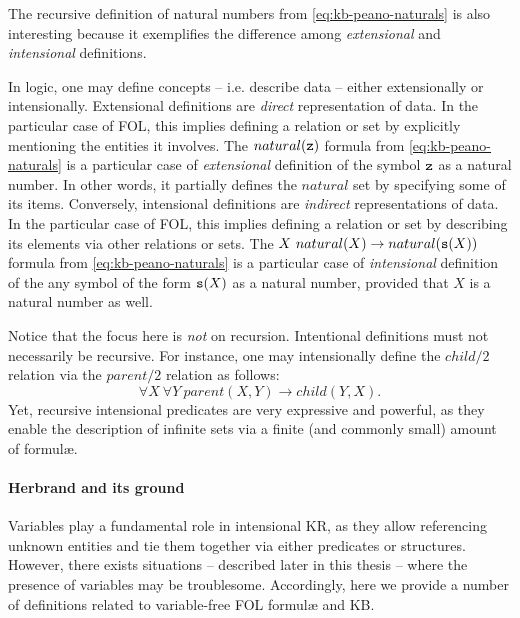 \documentclass[12pt,a4paper,openright,twoside]{book}
\begin{document}
The recursive definition of natural numbers from \cref{eq:kb-peano-naturals} is also interesting because it exemplifies the difference among \emph{extensional} and \emph{intensional} definitions.

In logic, one may define concepts -- i.e. describe data -- either extensionally or intensionally.
%
Extensional definitions are \emph{direct} representation of data.
%
In the particular case of FOL, this implies defining a relation or set by explicitly mentioning the entities it involves.
%
The $natural(\mathtt{z})$ formula from \cref{eq:kb-peano-naturals} is a particular case of \emph{extensional} definition of the symbol $\mathtt{z}$ as a natural number.
%
In other words, it partially defines the $natural$ set by specifying some of its items.
%
Conversely, intensional definitions are \emph{indirect} representations of data.
%
In the particular case of FOL, this implies defining a relation or set by describing its elements via other relations or sets.
%
The $X\ natural(X) \rightarrow natural(\functor{s}(X))$ formula from \cref{eq:kb-peano-naturals} is a particular case of \emph{intensional} definition of the any symbol of the form $\mathtt{s}(X)$ as a natural number, provided that $X$ is a natural number as well.

Notice that the focus here is \emph{not} on recursion.
%
Intentional definitions must not necessarily be recursive.
%
For instance, one may intensionally define the $child/2$ relation via the $parent/2$ relation as follows:
%
\begin{equation*}
    \forall X ~ \forall Y\ parent(X, Y) \rightarrow child(Y, X).
\end{equation*}
%
Yet, recursive intensional predicates are very expressive and powerful, as they enable the description of infinite sets via a finite (and commonly small) amount of formul\ae{}.

\paragraph{Herbrand and its ground}\label{par:herbrand}

Variables play a fundamental role in intensional KR, as they allow referencing unknown entities and tie them together via either predicates or structures.
%
However, there exists situations -- described later in this thesis -- where the presence of variables may be troublesome.
%
Accordingly, here we provide a number of definitions related to variable-free FOL formul\ae{} and KB.
\end{document}
